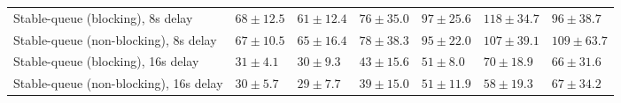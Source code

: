 \begin{table}[H]
{\begin{tabular}{l w{c}{5.0em} w{c}{5.0em} w{c}{5.0em} w{c}{5.0em} w{c}{5.0em} w{c}{5.0em}}
Stable-queue (blocking), 8s delay & $68\pm12.5$ & $61\pm12.4$ & $76\pm35.0$ & $97\pm25.6$ & $118\pm34.7$ & $96\pm38.7$ \\
Stable-queue (non-blocking), 8s delay & $67\pm10.5$ & $65\pm16.4$ & $78\pm38.3$ & $95\pm22.0$ & $107\pm39.1$ & $109\pm63.7$ \\
Stable-queue (blocking), 16s delay & $31\pm4.1$ & $30\pm9.3$ & $43\pm15.6$ & $51\pm8.0$ & $70\pm18.9$ & $66\pm31.6$ \\
Stable-queue (non-blocking), 16s delay & $30\pm5.7$ & $29\pm7.7$ & $39\pm15.0$ & $51\pm11.9$ & $58\pm19.3$ & $67\pm34.2$ \\
\bottomrule
\end{tabular}%
}
\end{table}
